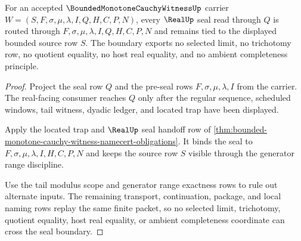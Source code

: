 \begin{theorem}
\label{thm:bounded-monotone-cauchy-witness-real-seal-boundary}
For an accepted $\BoundedMonotoneCauchyWitnessUp$ carrier $W=(S,F,\sigma,\mu,\lambda,I,Q,H,C,P,N)$, every $\RealUp$ seal read through $Q$ is routed through $F,\sigma,\mu,\lambda,I,Q,H,C,P,N$ and remains tied to the displayed bounded source row $S$. The boundary exports no selected limit, no trichotomy row, no quotient equality, no host real equality, and no ambient completeness principle.
\end{theorem}
\begin{proof}
Project the seal row $Q$ and the pre-seal rows $F,\sigma,\mu,\lambda,I$ from the carrier. The real-facing consumer reaches $Q$ only after the regular sequence, scheduled windows, tail witness, dyadic ledger, and located trap have been displayed.

Apply the located trap and $\RealUp$ seal handoff row of \autoref{thm:bounded-monotone-cauchy-witness-namecert-obligations}. It binds the seal to $F,\sigma,\mu,\lambda,I,H,C,P,N$ and keeps the source row $S$ visible through the generator range discipline.

Use the tail modulus scope and generator range exactness rows to rule out alternate inputs. The remaining transport, continuation, package, and local naming rows replay the same finite packet, so no selected limit, trichotomy, quotient equality, host real equality, or ambient completeness coordinate can cross the seal boundary.
\end{proof}

